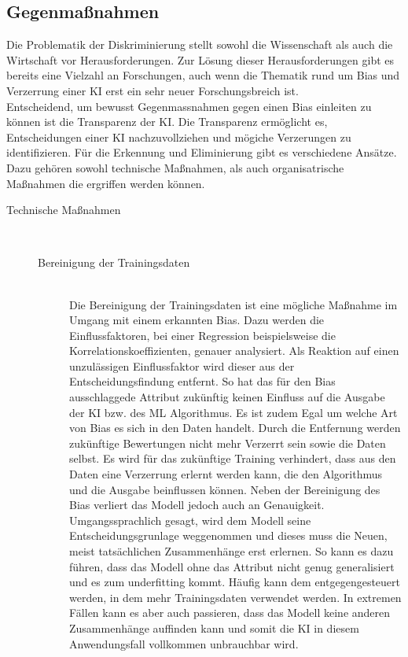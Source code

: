 \begin{onehalfspace}
    \subsection{Gegenma{\ss}nahmen}
    \label{subsubsec:gegenmassnahmen}
        Die Problematik der Diskriminierung stellt sowohl die Wissenschaft als auch die Wirtschaft vor Herausforderungen. Zur Lösung dieser Herausforderungen gibt es bereits eine Vielzahl an Forschungen, auch wenn die Thematik rund um Bias und Verzerrung einer \ac*{KI} erst ein sehr neuer Forschungsbreich ist.
        \\
        Entscheidend, um bewusst Gegenma{ss}nahmen gegen einen Bias einleiten zu können ist die Transparenz der \ac*{KI}. Die Transparenz ermöglicht es, Entscheidungen einer \ac*{KI} nachzuvollziehen und mögiche Verzerungen zu identifizieren. Für die Erkennung und Eliminierung gibt es verschiedene Ansätze. Dazu gehören sowohl technische Maßnahmen, als auch organisatrische Maßnahmen die ergriffen werden können. 
        \begin{description}
            \item[Technische Maßnahmen] \hfill \\
            \begin{description}
                \item[Bereinigung der Trainingsdaten] \hfill \\
                Die Bereinigung der Trainingsdaten ist eine mögliche Maßnahme im Umgang mit einem erkannten Bias. Dazu werden die Einflussfaktoren, bei einer Regression beispielsweise die Korrelationskoeffizienten, genauer analysiert. Als Reaktion auf einen unzulässigen Einflussfaktor wird dieser aus der Entscheidungsfindung entfernt. So hat das für den Bias ausschlaggede Attribut zukünftig keinen Einfluss auf die Ausgabe der \ac*{KI} bzw. des \ac*{ML} Algorithmus. Es ist zudem Egal um welche Art von Bias es sich in den Daten handelt. Durch die Entfernung werden zukünftige Bewertungen nicht mehr Verzerrt sein sowie die Daten selbst. Es wird für das zukünftige Training verhindert, dass aus den Daten eine Verzerrung erlernt werden kann, die den Algorithmus und die Ausgabe beinflussen können.\cite{hagendorff2019maschinelles} Neben der Bereinigung des Bias verliert das Modell jedoch auch an Genauigkeit. Umgangssprachlich gesagt, wird dem Modell seine Entscheidungsgrunlage weggenommen und dieses muss die Neuen, meist tatsächlichen Zusammenhänge erst erlernen. So kann es dazu führen, dass das Modell ohne das Attribut nicht genug generalisiert und es zum underfitting kommt. Häufig kann dem entgegengesteuert werden, in dem mehr Trainingsdaten verwendet werden. In extremen Fällen kann es aber auch passieren, dass das Modell keine anderen Zusammenhänge auffinden kann und somit die \ac*{KI} in diesem Anwendungsfall vollkommen unbrauchbar wird.\cite{hagendorff2019maschinelles}


\end{description}
\end{description}
\end{onehalfspace}
